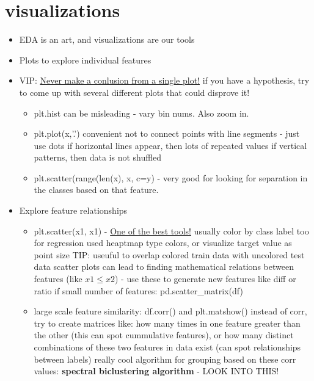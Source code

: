 \documentclass[a4paper]{report}
\begin{document}
\section{visualizations}
\begin{itemize}
  \item EDA is an art, and visualizations are our tools
  \item Plots to explore individual features
  \item VIP: \underline{Never make a conlusion from a single plot!} if you have a hypothesis, try to come up with several different plots that could disprove it!
    \begin{itemize}
      \item {\color{brown} plt.hist}
	\subitem can be misleading - vary bin nums. Also zoom in.
      \item {\color{brown} plt.plot(x,'.')}
	\subitem convenient not to connect points with line segments - just use dots
	\subitem if horizontal lines appear, then lots of repeated values
	\subitem if vertical patterns, then data is not shuffled
      \item {\color{brown} plt.scatter(range(len(x), x, c=y)} - very good for looking for separation in the classes based on that feature.
    \end{itemize}
  \item Explore feature relationships
    \begin{itemize}
      \item {\color{brown} plt.scatter(x1, x1)} - \underline{One of the best tools!}
	\subitem usually color by class label too
	\subitem for regression used heaptmap type colors, or visualize target value as point size
  	\subitem TIP: useuful to overlap colored train data with uncolored test data 
	\subitem scatter plots can lead to finding mathematical relations between features (like $x1 \leq x2$) - use these to generate new features like diff or ratio
	\subitem if small number of features: {\color{brown} pd.scatter\_matrix(df)}
      \item large scale feature similarity: {\color{brown} df.corr()} and {\color{brown} plt.matshow()}
	\subitem instead of corr, try to create matrices like: how many times in one feature greater than the other (this can spot cummulative features), or how many distinct combinations of these two features in data exist (can spot relationships between labels)
	\subitem really  cool algorithm for grouping based on these corr values: {\bf spectral biclustering algorithm} - {\color{red}LOOK INTO THIS!}

\end{itemize}
\end{itemize}
\end{document}
